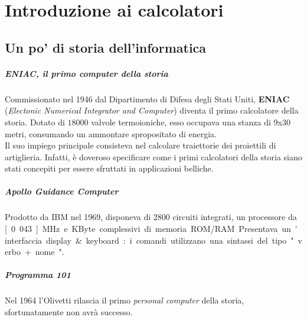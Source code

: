\chapter{Introduzione ai calcolatori}

\section{Un po' di storia dell'informatica}
\paragraph{ENIAC, il primo computer della storia}
Commissionato nel 1946 dal Dipartimento di Difesa degli Stati Uniti, \textbf{ENIAC} (\textit{Electonic Numerical Integrator and Computer}) diventa il primo calcolatore della storia.
Dotato di $18000$ valvole termoioniche, esso occupava una stanza di 9x30 metri, consumando un ammontare spropositato di energia.\\
Il suo impiego principale consisteva nel calcolare traiettorie dei proiettili di artiglieria. Infatti, è doveroso specificare come i primi calcolatori della storia siano stati concepiti per essere sfruttati in applicazioni belliche.

\paragraph{Apollo Guidance Computer}
Prodotto da IBM nel 1969, disponeva di 2800 circuiti integrati, un processore da \unit[0.043]{MHz} e \unit[152]{KByte}  complessivi di memoria ROM/RAM. Presentava un'interfaccia display\&keyboard: i comandi utilizzano una sintassi del tipo "verbo + nome".

\paragraph{Programma 101} Nel 1964 l'Olivetti rilascia il primo \textit{personal computer} della storia, sfortunatamente non avrà successo. 

